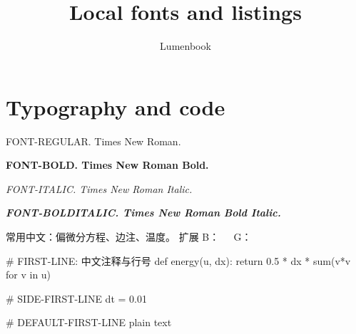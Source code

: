 \documentclass{lumenbook}
\title{Local fonts and listings}
\author{Lumenbook}
\begin{document}
\chapter{Typography and code}
FONT-REGULAR. Times New Roman.\par
\textbf{FONT-BOLD. Times New Roman Bold.}\par
\textit{FONT-ITALIC. Times New Roman Italic.}\par
\textbf{\textit{FONT-BOLDITALIC. Times New Roman Bold Italic.}}\par
常用中文：偏微分方程、边注、温度。
扩展 B：𠀀；扩展 G：𰀀。
\begin{codeblock}[language=Python,title={Discrete energy},firstnumber=12]
# FIRST-LINE: 中文注释与行号
def energy(u, dx):
    return 0.5 * dx * sum(v*v for v in u)
\end{codeblock}
\begin{margincode}[language=Python]
# SIDE-FIRST-LINE
dt = 0.01
\end{margincode}
\begin{codeblock}
# DEFAULT-FIRST-LINE
plain text
\end{codeblock}
\end{document}
